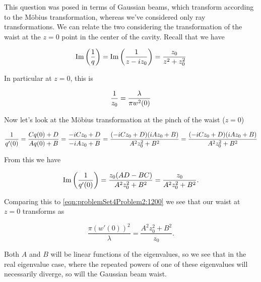 {This question was posed in terms of Gaussian beams, which transform according to the M\"obius transformation, whereas we've considered only ray transformations.  We can relate the two considering the transformation of the waist at the $z = 0$ point in the center of the cavity.  Recall that we have

\begin{dmath}\label{eqn:problemSet4Problem2:1180}
\Imag\left( \inv{q} \right)
= \Imag \left( \inv{z - i z_0} \right)
= \frac{z_0}{z^2 + z_0^2}
\end{dmath}

In particular at $z = 0$, this is 

\begin{dmath}\label{eqn:problemSet4Problem2:1200}
\inv{z_0} = \frac{\lambda}{\pi w^2(0)}
\end{dmath}

Now let's look at the M\"obius transformation at the pinch of the waist ($z = 0$)

\begin{dmath}\label{eqn:problemSet4Problem2:1220}
\inv{q'(0)} 
= \frac{C q(0) + D}{A q(0) + B}
= \frac{-i C z_0 + D}{-i A z_0 + B}
= \frac{(-i C z_0 + D)( i A z_0 + B)}{
A^2 z_0^2 + B^2
}
= 
\frac{(-i C z_0 + D)( i A z_0 + B)}{
A^2 z_0^2 + B^2
}
\end{dmath}

From this we have

\begin{dmath}\label{eqn:problemSet4Problem2:1240}
\Imag\left( 
\inv{q'(0)} 
\right)
=
\frac{ z_0 (A D - B C)}
{
A^2 z_0^2 + B^2
}
=
\frac{ z_0 }
{
A^2 z_0^2 + B^2
}.
\end{dmath}

Comparing this to \ref{eqn:problemSet4Problem2:1200} we see that our waist at $z = 0$ transforms as

\begin{dmath}\label{eqn:problemSet4Problem2:1260}
\frac
{\pi (w'(0))^2}
{\lambda}
=
\frac
{
A^2 z_0^2 + B^2
}
{ z_0 }.
\end{dmath}

Both $A$ and $B$ will be linear functions of the eigenvalues, so we see that in the real eigenvalue case, where the repeated powers of one of these eigenvalues will necessarily diverge, so will the Gaussian beam waist.

}
